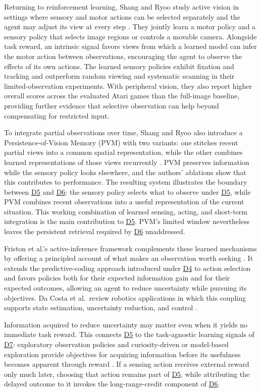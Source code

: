\documentclass[10pt,journal,compsoc]{IEEEtran}
\DeclareRobustCommand{\Dref}[1]{\hyperref[sec:d#1]{D#1}}
\begin{document}
Returning to reinforcement learning, Shang and Ryoo study active vision in settings where sensory and motor actions can be selected separately and the agent may adjust its view at every step \cite{shang2023}.
They jointly learn a motor policy and a sensory policy that selects image regions or controls a movable camera.
Alongside task reward, an intrinsic signal favors views from which a learned model can infer the motor action between observations, encouraging the agent to observe the effects of its own actions.
The learned sensory policies exhibit fixation and tracking and outperform random viewing and systematic scanning in their limited-observation experiments.
With peripheral vision, they also report higher overall scores across the evaluated Atari games than the full-image baseline, providing further evidence that selective observation can help beyond compensating for restricted input.

To integrate partial observations over time, Shang and Ryoo also introduce a Persistence-of-Vision Memory (PVM) with two variants: one stitches recent partial views into a common spatial representation, while the other combines learned representations of those views recurrently \cite{shang2023}.
PVM preserves information while the sensory policy looks elsewhere, and the authors' ablations show that this contributes to performance.
The resulting system illustrates the boundary between \Dref{5} and \Dref{6}: the sensory policy selects what to observe under \Dref{5}, while PVM combines recent observations into a useful representation of the current situation.
This working combination of learned sensing, acting, and short-term integration is the main contribution to \Dref{5}.
PVM's limited window nevertheless leaves the persistent retrieval required by \Dref{6} unaddressed.

Friston et al.'s active-inference framework complements these learned mechanisms by offering a principled account of what makes an observation worth seeking \cite{friston2017}.
It extends the predictive-coding approach introduced under \Dref{4} to action selection and favors policies both for their expected information gain and for their expected outcomes, allowing an agent to reduce uncertainty while pursuing its objectives.
Da Costa et al.\ review robotics applications in which this coupling supports state estimation, uncertainty reduction, and control \cite{dacosta2022}.

Information acquired to reduce uncertainty may matter even when it yields no immediate task reward.
This connects \Dref{5} to the task-agnostic learning signals of \Dref{7}: exploratory observation policies and curiosity-driven or model-based exploration provide objectives for acquiring information before its usefulness becomes apparent through reward \cite{jayaraman2018,pathak2017,sekar2020}.
If a sensing action receives external reward only much later, choosing that action remains part of \Dref{5}, while attributing the delayed outcome to it invokes the long-range-credit component of \Dref{6}.
\end{document}
